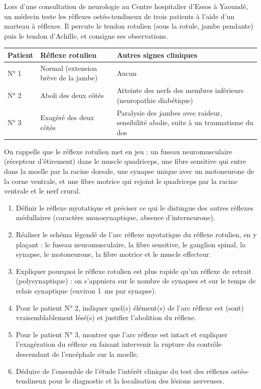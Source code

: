 \documentclass[11pt]{article}
\begin{document}
\begin{exercice}
Lors d'une consultation de neurologie au Centre hospitalier d'Essos à Yaoundé, un médecin teste les réflexes ostéo-tendineux de trois patients à l'aide d'un marteau à réflexes. Il percute le tendon rotulien (sous la rotule, jambe pendante) puis le tendon d'Achille, et consigne ses observations.

\begin{center}
\begin{tabularx}{\linewidth}{|l|X|X|}
\hline
\rowcolor{popblueL} \textbf{Patient} & \textbf{Réflexe rotulien} & \textbf{Autres signes cliniques} \\
\hline
N° 1 & Normal (extension brève de la jambe) & Aucun \\
\hline
N° 2 & Aboli des deux côtés & Atteinte des nerfs des membres inférieurs (neuropathie diabétique) \\
\hline
N° 3 & Exagéré des deux côtés & Paralysie des jambes avec raideur, sensibilité abolie, suite à un traumatisme du dos \\
\hline
\end{tabularx}
\end{center}

On rappelle que le réflexe rotulien met en jeu : un fuseau neuromusculaire (récepteur d'étirement) dans le muscle quadriceps, une fibre sensitive qui entre dans la moelle par la racine dorsale, une synapse unique avec un motoneurone de la corne ventrale, et une fibre motrice qui rejoint le quadriceps par la racine ventrale et le nerf crural.

\begin{enumerate}
\item Définir le réflexe myotatique et préciser ce qui le distingue des autres réflexes médullaires (caractère monosynaptique, absence d'interneurone).
\item Réaliser le schéma légendé de l'arc réflexe myotatique du réflexe rotulien, en y plaçant : le fuseau neuromusculaire, la fibre sensitive, le ganglion spinal, la synapse, le motoneurone, la fibre motrice et le muscle effecteur.
\item Expliquer pourquoi le réflexe rotulien est plus rapide qu'un réflexe de retrait (polysynaptique) : on s'appuiera sur le nombre de synapses et sur le temps de relais synaptique (environ \SI{1}{ms} par synapse).
\item Pour le patient N° 2, indiquer quel(s) élément(s) de l'arc réflexe est (sont) vraisemblablement lésé(s) et justifier l'abolition du réflexe.
\item Pour le patient N° 3, montrer que l'arc réflexe est intact et expliquer l'exagération du réflexe en faisant intervenir la rupture du contrôle descendant de l'encéphale sur la moelle.
\item Déduire de l'ensemble de l'étude l'intérêt clinique du test des réflexes ostéo-tendineux pour le diagnostic et la localisation des lésions nerveuses.
\end{enumerate}
\end{exercice}
\end{document}
